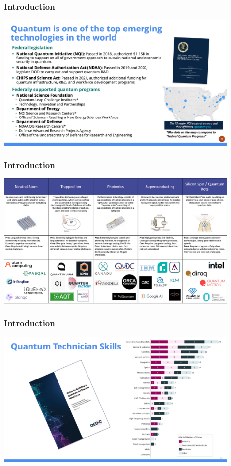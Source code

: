 \documentclass{beamer}
\begin{document}
\begin{frame}\frametitle{Introduction}
\begin{center}
\includegraphics[width=12cm]{fig/Slide9.jpeg}
\end{center}
\end{frame}

\begin{frame}\frametitle{Introduction}
\begin{center}
\includegraphics[width=12cm]{fig/Slide10.jpeg}
\end{center}
\end{frame}

\begin{frame}\frametitle{Introduction}
\begin{center}
\includegraphics[width=12cm]{fig/Slide11.jpeg}
\end{center}
\end{frame}
\end{document}
